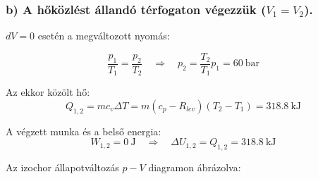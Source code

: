 \subsubsection{b) A hőközlést állandó térfogaton végezzük ($ V_1=V_2 $).}
\vspace{2mm}
\noindent $dV = 0 $ esetén a megváltozott nyomás:

\begin{equation}
\dfrac{p_1}{T_1}=\dfrac{p_2}{T_2}
\quad
\Rightarrow
\quad
p_2=\dfrac{T_2}{T_1}p_1=\SI{60}{\bar}
\end{equation}

\noindent Az ekkor közölt hő:
\begin{equation}
Q_{1,2}=m c_v \Delta T=m \left(c_p-R_{lev}\right) \left(T_2-T_1 \right)=\SI{318,8}{\kilo\joule}
\end{equation}

\noindent A végzett munka és a belső energia:
\begin{equation}
W_{1,2}=\SI{0}{\joule}
\quad
\Rightarrow
\quad
\Delta U_{1,2}= Q_{1,2}=\SI{318,8}{\kilo\joule}
\end{equation}



\noindent Az izochor állapotváltozás $p-V$ diagramon ábrázolva:

